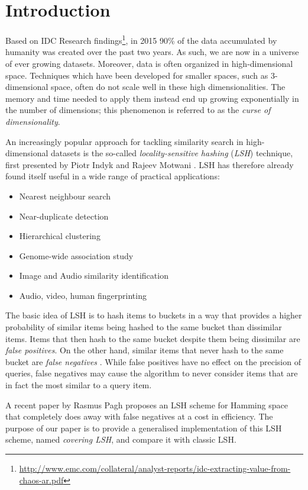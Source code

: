\section{Introduction}
\label{introduction}

Based on IDC Research findings\footnote{\url{http://www.emc.com/collateral/analyst-reports/idc-extracting-value-from-chaos-ar.pdf}}, in 2015 90\% of the data accumulated by humanity was created over the past two years. As such, we are now in a universe of ever growing datasets. Moreover, data is often organized in high-dimensional space. Techniques which have been developed for smaller spaces, such as 3-dimensional space, often do not scale well in these high dimensionalities. The memory and time needed to apply them instead end up growing exponentially in the number of dimensions; this phenomenon is referred to as the \textit{curse of dimensionality}.

An increasingly popular approach for tackling similarity search in high-dimensional datasets is the so-called \textit{locality-sensitive hashing} (\textit{LSH}) technique, first presented by Piotr Indyk and Rajeev Motwani \cite{DBLP:conf/stoc/IndykM98}. LSH has therefore already found itself useful in a wide range of practical applications:

\begin{itemize}
  \item Nearest neighbour search
  \item Near-duplicate detection
  \item Hierarchical clustering
  \item Genome-wide association study
  \item Image and Audio similarity identification
  \item Audio, video, human fingerprinting
\end{itemize}

The basic idea of LSH is to hash items to buckets in a way that provides a higher probability of similar items being hashed to the same bucket than dissimilar items. Items that then hash to the same bucket despite them being dissimilar are \textit{false positives}. On the other hand, similar items that never hash to the same bucket are \textit{false negatives} \cite[p. 88]{DBLP:books/cu/LeskovecRU14}. While false positives have no effect on the precision of queries, false negatives may cause the algorithm to never consider items that are in fact the most similar to a query item.

A recent paper by Rasmus Pagh \cite{DBLP:journals/corr/Pagh15} proposes an LSH scheme for Hamming space that completely does away with false negatives at a cost in efficiency. The purpose of our paper is to provide a generalised implementation of this LSH scheme, named \textit{covering LSH}, and compare it with classic LSH.

